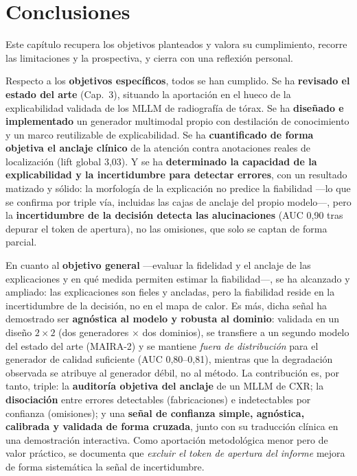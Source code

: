 \chapter{Conclusiones}

Este capítulo recupera los objetivos planteados y valora su cumplimiento, recorre las limitaciones
y la prospectiva, y cierra con una reflexión personal.

Respecto a los \textbf{objetivos específicos}, todos se han cumplido. Se ha \textbf{revisado el
estado del arte} (Cap.~3), situando la aportación en el hueco de la explicabilidad validada de los
MLLM de radiografía de tórax. Se ha \textbf{diseñado e implementado} un generador multimodal propio
con destilación de conocimiento y un marco reutilizable de explicabilidad. Se ha \textbf{cuantificado
de forma objetiva el anclaje clínico} de la atención contra anotaciones reales de localización
(lift global 3,03). Y se ha \textbf{determinado la capacidad de la explicabilidad y la incertidumbre
para detectar errores}, con un resultado matizado y sólido: la morfología de la explicación no
predice la fiabilidad —lo que se confirma por triple vía, incluidas las cajas de anclaje del propio
modelo—, pero la \textbf{incertidumbre de la decisión detecta las alucinaciones} (AUC 0,90 tras
depurar el token de apertura), no las omisiones, que solo se captan de forma parcial.

En cuanto al \textbf{objetivo general} —evaluar la fidelidad y el anclaje de las explicaciones y en
qué medida permiten estimar la fiabilidad—, se ha alcanzado y ampliado: las explicaciones son fieles
y ancladas, pero la fiabilidad reside en la incertidumbre de la decisión, no en el mapa de calor. Es
más, dicha señal ha demostrado ser \textbf{agnóstica al modelo y robusta al dominio}: validada en un
diseño \(2\times2\) (dos generadores \(\times\) dos dominios), se transfiere a un segundo modelo del
estado del arte (MAIRA-2) y se mantiene \emph{fuera de distribución} para el generador de calidad
suficiente (AUC 0,80--0,81), mientras que la degradación observada se atribuye al generador débil, no
al método. La contribución es, por tanto, triple: la \textbf{auditoría objetiva del anclaje} de un
MLLM de CXR; la \textbf{disociación} entre errores detectables (fabricaciones) e indetectables por
confianza (omisiones); y una \textbf{señal de confianza simple, agnóstica, calibrada y validada de
forma cruzada}, junto con su traducción clínica en una demostración interactiva. Como aportación
metodológica menor pero de valor práctico, se documenta que \emph{excluir el token de apertura del
informe} mejora de forma sistemática la señal de incertidumbre.

